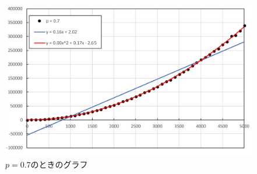 \documentclass[a4j,titlepage]{jsarticle}
\begin{document}
\begin{figure}[H]
  \centering
  \includegraphics[width=13cm]{kadai14-1-7.png}
  \caption{$p=0.7$のときのグラフ}
  \label{fig:kekka14-1x}
\end{figure}
\end{document}

